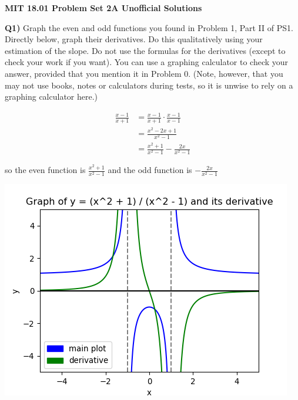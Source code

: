 \documentclass[9pt]{article}
\begin{document}
\begin{center}
  \large\textbf{MIT 18.01 Problem Set 2A Unofficial Solutions}
\end{center}

\begin{tcolorbox}
  \textbf{Q1)} Graph the even and odd functions you found in Problem 1, Part II of PS1. Directly below, graph their derivatives. Do this qualitatively using your estimation of the slope. Do not use the formulas for the derivatives (except to check your work if you want). You can use a graphing calculator to check your answer, provided that you mention it in Problem 0. (Note, however, that you may not use books, notes or calculators during tests, so it is unwise to rely on a graphing calculator here.)
\end{tcolorbox}
\begin{align*}
  \frac{x - 1}{x + 1} &= \frac{x - 1}{x + 1} \cdot \frac{x - 1}{x - 1}\\
                      &= \frac{x^2 - 2x + 1}{x^2 - 1}\\
                      &= \frac{x^2 + 1}{x^2 - 1} - \frac{2x}{x^2 - 1}
\end{align*}

so the even function is $\frac{x^2 + 1}{x^2 - 1}$ and the odd function is $-\frac{2x}{x^2 - 1}$

\begin{center}
  \includegraphics[scale=0.8]{q1_even.png}
\end{center}
\end{document}
